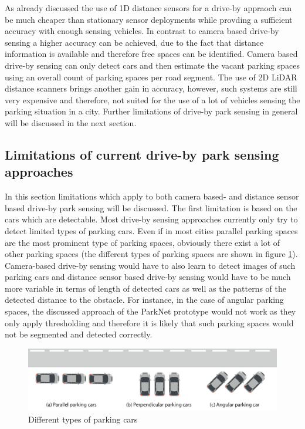 As already discussed the use of 1D distance sensors for a drive-by appraoch can be much cheaper than stationary sensor deployments while provding a sufficient accuracy with enough sensing vehicles. In contrast to camera based drive-by sensing a higher accuracy can be achieved, due to the fact that distance information is available and therefore free spaces can be identified. Camera based drive-by sensing can only detect cars and then estimate the vacant parking spaces using an overall count of parking spaces per road segment. The use of 2D LiDAR distance scanners brings another gain in accuracy, however, such systems are still very expensive and therefore, not suited for the use of a lot of vehicles sensing the parking situation in a city. Further limitations of drive-by park sensing in general will be discussed in the next section.


\subsection{Limitations of current drive-by park sensing approaches}
\label{sec:limitations_driveby_sensing}

In this section limitations which apply to both camera based- and distance sensor based drive-by park sensing will be discussed. The first limitation is based on the cars which are detectable. Most drive-by sensing approaches currently only try to detect limited types of parking cars. Even if in most cities parallel parking spaces are the most prominent type of parking spaces, obviously there exist a lot of other parking spaces (the different types of parking spaces are shown in figure \ref{fig:types_of_parking_cars}). Camera-based drive-by sensing would have to also learn to detect images of such parking cars and distance sensor based drive-by sensing would have to be much more variable in terms of length of detected cars as well as the patterns of the detected distance to the obstacle. For instance, in the case of angular parking spaces, the discussed approach of the ParkNet prototype would not work as they only apply thresholding and therefore it is likely that such parking spaces would not be segmented and detected correctly.

\begin{figure}
	\centering
	\includegraphics[width=\textwidth]{img/types-of-parking-cars.eps}
	\caption{Different types of parking cars}
	\label{fig:types_of_parking_cars}
\end{figure}


